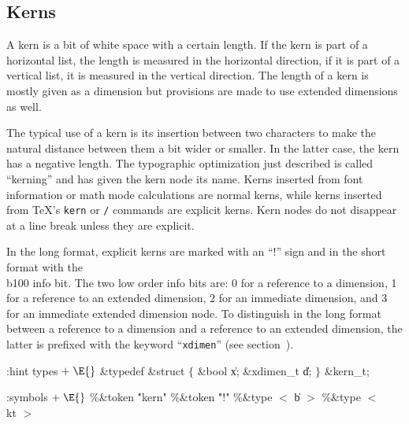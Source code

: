 


\subsection{Kerns}
A kern is a bit of white space with a certain length. If the kern is part of a
horizontal list, the length is measured in the horizontal direction,
if it is part of a vertical list, it is measured in the vertical
direction. The length of a kern is mostly given as a dimension
but provisions are made to use extended dimensions as well.

The typical
use of a kern is its insertion between two characters to make the natural
distance between them a bit wider or smaller. In the latter case, the kern
has a negative length. The typographic optimization just described is called
``kerning'' and has given the kern node its name.
Kerns inserted from font information or math mode calculations are normal kerns,
while kerns inserted from \TeX's {\tt \BS kern} or {\tt \BS/}
commands are explicit kerns.
Kern nodes do not disappear at a line break unless they are explicit.

In the long format, explicit kerns are marked with an ``!'' sign
and in the short format with the \\{b100} info bit.
The two low order info bits are: 0 for a reference to a dimension, 1 for a reference to
an extended dimension, 2 for an immediate dimension, and 3 for an immediate extended dimension node.
To distinguish in the long format between a reference to a dimension and a reference to an extended dimension,
the latter is prefixed with the keyword ``{\tt xdimen}'' (see section~).

\Y\B\4:hint types\X${}\mathrel+\E{}$\6
\&{typedef} \&{struct} ${}\{{}$\5
\1\&{bool} \|x;\5
\&{xdimen\_t} \|d;\5
\2${}\}{}$ \&{kern\_t};
\Y
\fi


\readcode
\Y\par
\par
\par
\par
\Y\B\4:symbols\X${}\mathrel+\E{}$\6
\8\%\&{token} \5\.{"kern"}\6
\8\%\&{token} \5\.{"!"}\6
\8\%\&{type} $<$ \|b $>$  \6
\8\%\&{type} $<$ \\{kt} $>$ 
\Y
\fi

